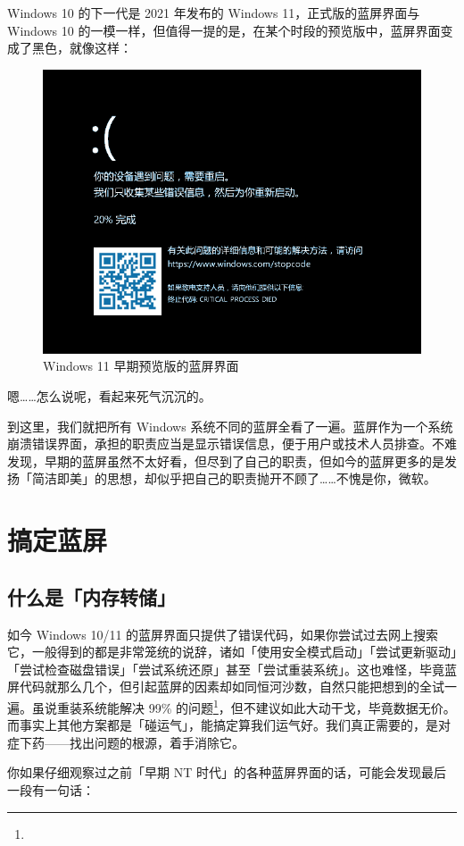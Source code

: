 Windows 10 的下一代是 2021 年发布的 Windows 11，正式版的蓝屏界面与 Windows 10 的一模一样，但值得一提的是，在某个时段的预览版中，蓝屏界面变成了黑色，就像这样：

\begin{figure}[htb!]
  \centering
  \includegraphics[width=.6\textwidth]{assets/advanced/Win-11-Pre-BSoD.png}
  \caption{Windows 11 早期预览版的蓝屏界面}
  \label{fig:Win-11-Pre-BSoD}
\end{figure}

嗯……怎么说呢，看起来死气沉沉的。

到这里，我们就把所有 Windows 系统不同的蓝屏全看了一遍。蓝屏作为一个系统崩溃错误界面，承担的职责应当是显示错误信息，便于用户或技术人员排查。不难发现，早期的蓝屏虽然不太好看，但尽到了自己的职责，但如今的蓝屏更多的是发扬「简洁即美」的思想，却似乎把自己的职责抛开不顾了……不愧是你，微软。

\section{搞定蓝屏}

\subsection{什么是「内存转储」}

如今 Windows 10/11 的蓝屏界面只提供了错误代码，如果你尝试过去网上搜索它，一般得到的都是非常笼统的说辞，诸如「使用安全模式启动」「尝试更新驱动」「尝试检查磁盘错误」「尝试系统还原」甚至「尝试重装系统」。这也难怪，毕竟蓝屏代码就那么几个，但引起蓝屏的因素却如同恒河沙数，自然只能把想到的全试一遍。虽说重装系统能解决 99\% 的问题\footnote{}，但不建议如此大动干戈，毕竟数据无价。而事实上其他方案都是「碰运气」，能搞定算我们运气好。我们真正需要的，是对症下药——找出问题的根源，着手消除它。

你如果仔细观察过之前「早期 NT 时代」的各种蓝屏界面的话，可能会发现最后一段有一句话：

